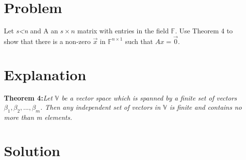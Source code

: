 \documentclass[journal,12pt,twocolumn]{IEEEtran}
\begin{document}
\section{Problem}
Let \textit{s\textless n} and A an $s\times n$ matrix with entries in the field $\mathbb{F}$. Use Theorem 4 to show that there is a non-zero $\vec{x}$ in $\mathbb{F}^{n\times 1}$ such that $Ax=\vec{0}$. 
\section{Explanation}
\textbf{Theorem 4:}\textit{Let $\mathbb{V}$ be a vector space which is spanned by a finite set of vectors $\beta_1,\beta_2,...,\beta_m$. Then any independent set of vectors in $\mathbb{V}$ is finite and contains no more than m elements.}
\section{Solution}
\end{document}
